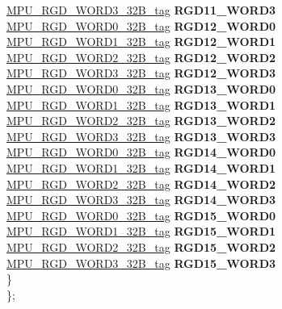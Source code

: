 \begin{DoxyCompactItemize}
\begin{tabbing}
\>\>\mbox{\hyperlink{unionMPU__RGD__WORD3__32B__tag}{MPU\_RGD\_WORD3\_32B\_tag}} {\bfseries RGD11\_WORD3}\\
\>\>\mbox{\hyperlink{unionMPU__RGD__WORD0__32B__tag}{MPU\_RGD\_WORD0\_32B\_tag}} {\bfseries RGD12\_WORD0}\\
\>\>\mbox{\hyperlink{unionMPU__RGD__WORD1__32B__tag}{MPU\_RGD\_WORD1\_32B\_tag}} {\bfseries RGD12\_WORD1}\\
\>\>\mbox{\hyperlink{unionMPU__RGD__WORD2__32B__tag}{MPU\_RGD\_WORD2\_32B\_tag}} {\bfseries RGD12\_WORD2}\\
\>\>\mbox{\hyperlink{unionMPU__RGD__WORD3__32B__tag}{MPU\_RGD\_WORD3\_32B\_tag}} {\bfseries RGD12\_WORD3}\\
\>\>\mbox{\hyperlink{unionMPU__RGD__WORD0__32B__tag}{MPU\_RGD\_WORD0\_32B\_tag}} {\bfseries RGD13\_WORD0}\\
\>\>\mbox{\hyperlink{unionMPU__RGD__WORD1__32B__tag}{MPU\_RGD\_WORD1\_32B\_tag}} {\bfseries RGD13\_WORD1}\\
\>\>\mbox{\hyperlink{unionMPU__RGD__WORD2__32B__tag}{MPU\_RGD\_WORD2\_32B\_tag}} {\bfseries RGD13\_WORD2}\\
\>\>\mbox{\hyperlink{unionMPU__RGD__WORD3__32B__tag}{MPU\_RGD\_WORD3\_32B\_tag}} {\bfseries RGD13\_WORD3}\\
\>\>\mbox{\hyperlink{unionMPU__RGD__WORD0__32B__tag}{MPU\_RGD\_WORD0\_32B\_tag}} {\bfseries RGD14\_WORD0}\\
\>\>\mbox{\hyperlink{unionMPU__RGD__WORD1__32B__tag}{MPU\_RGD\_WORD1\_32B\_tag}} {\bfseries RGD14\_WORD1}\\
\>\>\mbox{\hyperlink{unionMPU__RGD__WORD2__32B__tag}{MPU\_RGD\_WORD2\_32B\_tag}} {\bfseries RGD14\_WORD2}\\
\>\>\mbox{\hyperlink{unionMPU__RGD__WORD3__32B__tag}{MPU\_RGD\_WORD3\_32B\_tag}} {\bfseries RGD14\_WORD3}\\
\>\>\mbox{\hyperlink{unionMPU__RGD__WORD0__32B__tag}{MPU\_RGD\_WORD0\_32B\_tag}} {\bfseries RGD15\_WORD0}\\
\>\>\mbox{\hyperlink{unionMPU__RGD__WORD1__32B__tag}{MPU\_RGD\_WORD1\_32B\_tag}} {\bfseries RGD15\_WORD1}\\
\>\>\mbox{\hyperlink{unionMPU__RGD__WORD2__32B__tag}{MPU\_RGD\_WORD2\_32B\_tag}} {\bfseries RGD15\_WORD2}\\
\>\>\mbox{\hyperlink{unionMPU__RGD__WORD3__32B__tag}{MPU\_RGD\_WORD3\_32B\_tag}} {\bfseries RGD15\_WORD3}\\
\>\} \\
\}; \\


\end{tabbing}
\end{DoxyCompactItemize}
